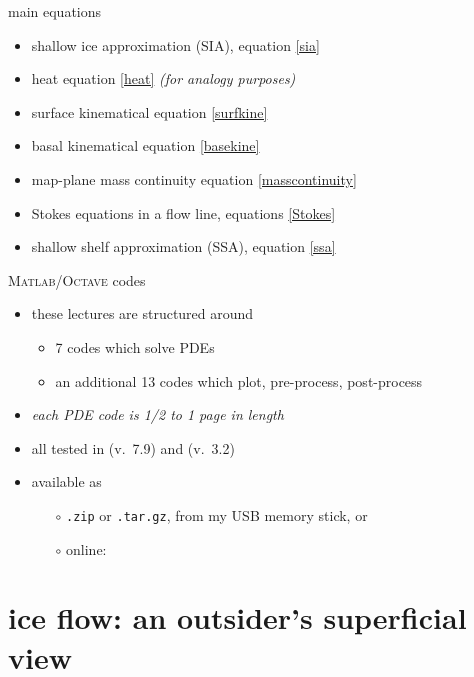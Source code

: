 \begin{frame}{main equations}

\begin{itemize}
\item shallow ice approximation (SIA), equation \eqref{sia}
\item heat equation \eqref{heat} \quad\small\emph{(for analogy purposes)} \normalsize
\item surface kinematical equation \eqref{surfkine}
\item basal kinematical equation \eqref{basekine}
\item map-plane mass continuity equation \eqref{masscontinuity}
\item Stokes equations in a flow line, equations \eqref{Stokes}
\item shallow shelf approximation (SSA), equation \eqref{ssa}
\end{itemize}
\end{frame}


\begin{frame}{\textsc{Matlab}/\textsc{Octave} codes}

\begin{itemize}
\item these lectures are structured around
  \begin{itemize}
    \item 7 codes which solve PDEs
    \item an additional 13 codes which plot, pre-process, post-process
  \end{itemize}
\item \emph{each PDE code is 1/2 to 1 page in length}
\item all tested in \Matlab \scriptsize(v.~7.9) \normalsize and \href{http://www.gnu.org/software/octave/}{\Octave} \scriptsize(v.~3.2)\normalsize
\item available as
  \begin{itemize}
    \item[$\circ$] \texttt{.zip} or \texttt{.tar.gz}, from my USB memory stick, or
    \item[$\circ$] online:  \bigskip\small
      \centerline{}
  \end{itemize}
\end{itemize}
\end{frame}


\section[ice flow: a superficial view]{ice flow: an outsider's superficial view}

